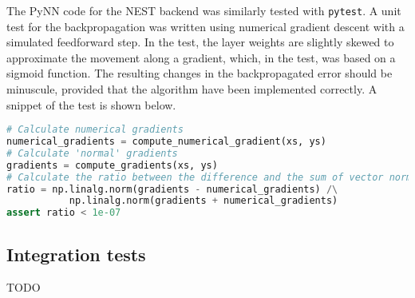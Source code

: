 The PyNN code for the NEST backend was similarly tested with \texttt{pytest}.
A unit test for the backpropagation was written using numerical gradient descent
with a simulated feedforward step.
In the test, the layer weights are slightly skewed to approximate the movement
along a gradient, which, in the test, was based on a sigmoid function.
The resulting changes in the backpropagated error should be minuscule, provided
that the algorithm have been implemented correctly.
A snippet of the test is shown below.

\begin{minipage}{\linewidth}
\begin{lstlisting}[language=Python,label={lst:volrpynn_numerical},caption={Part
of the numerical gradient test for the densely connected layer in PyNN.}]
# Calculate numerical gradients
numerical_gradients = compute_numerical_gradient(xs, ys)
# Calculate 'normal' gradients
gradients = compute_gradients(xs, ys)
# Calculate the ratio between the difference and the sum of vector norms
ratio = np.linalg.norm(gradients - numerical_gradients) /\
           np.linalg.norm(gradients + numerical_gradients)
assert ratio < 1e-07
\end{lstlisting}
\end{minipage}

\subsection{Integration tests}
TODO
